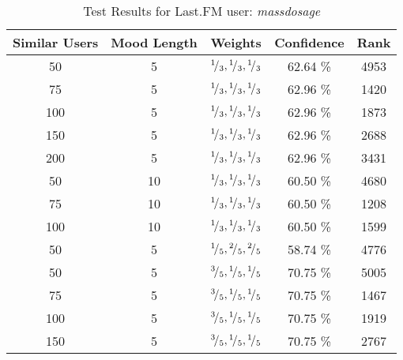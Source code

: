 \begin{table}[h!]
\centering
\begin{tabular}{ | c | c | c || c | c | }
\hline
Similar Users	& Mood Length	& Weights							&Confidence	&Rank\\
\hline \hline
50			& 5			& \({}^{1}\!/_{3}, {}^{1}\!/_{3}, {}^{1}\!/_{3}\)	&62.64 \%		&4953\\
\hline
75			& 5			& \({}^{1}\!/_{3}, {}^{1}\!/_{3}, {}^{1}\!/_{3}\)	&62.96 \%		&1420\\
\hline
100			& 5			& \({}^{1}\!/_{3}, {}^{1}\!/_{3}, {}^{1}\!/_{3}\)	&62.96 \%		&1873\\
\hline
150			& 5			& \({}^{1}\!/_{3}, {}^{1}\!/_{3}, {}^{1}\!/_{3}\)	&62.96 \%		&2688\\
\hline
200			& 5			& \({}^{1}\!/_{3}, {}^{1}\!/_{3}, {}^{1}\!/_{3}\)	&62.96 \%		&3431\\
\hline
50			& 10			& \({}^{1}\!/_{3}, {}^{1}\!/_{3}, {}^{1}\!/_{3}\)	&60.50 \%		&4680\\
\hline
75			& 10			& \({}^{1}\!/_{3}, {}^{1}\!/_{3}, {}^{1}\!/_{3}\)	&60.50 \%		&1208\\
\hline
100			& 10			& \({}^{1}\!/_{3}, {}^{1}\!/_{3}, {}^{1}\!/_{3}\)	&60.50 \%		&1599\\
\hline
50			& 5			& \({}^{1}\!/_{5}, {}^{2}\!/_{5}, {}^{2}\!/_{5}\)	&58.74 \%		&4776\\
\hline
50			& 5			& \({}^{3}\!/_{5}, {}^{1}\!/_{5}, {}^{1}\!/_{5}\)	&70.75 \%		&5005\\
\hline
75			& 5			& \({}^{3}\!/_{5}, {}^{1}\!/_{5}, {}^{1}\!/_{5}\)	&70.75 \%		&1467\\
\hline
100			& 5			& \({}^{3}\!/_{5}, {}^{1}\!/_{5}, {}^{1}\!/_{5}\)	&70.75 \%		&1919\\
\hline
150			& 5			& \({}^{3}\!/_{5}, {}^{1}\!/_{5}, {}^{1}\!/_{5}\)	&70.75 \%		&2767\\
\hline
\end{tabular}
\caption{Test Results for Last.FM user: \emph{massdosage}}
\label{table:test_results_massdosage}
\end{table}

